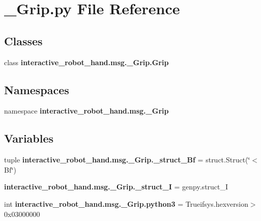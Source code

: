 \section{\-\_\-\-Grip.\-py File Reference}
\label{__Grip_8py}
\subsection*{Classes}
\begin{DoxyCompactItemize}
\item 
class {\bf interactive\-\_\-robot\-\_\-hand.\-msg.\-\_\-\-Grip.\-Grip}
\end{DoxyCompactItemize}
\subsection*{Namespaces}
\begin{DoxyCompactItemize}
\item 
namespace {\bf interactive\-\_\-robot\-\_\-hand.\-msg.\-\_\-\-Grip}
\end{DoxyCompactItemize}
\subsection*{Variables}
\begin{DoxyCompactItemize}
\item 
tuple {\bf interactive\-\_\-robot\-\_\-hand.\-msg.\-\_\-\-Grip.\-\_\-struct\-\_\-\-Bf} = struct.\-Struct(\char`\"{}$<$Bf\char`\"{})
\item 
{\bf interactive\-\_\-robot\-\_\-hand.\-msg.\-\_\-\-Grip.\-\_\-struct\-\_\-\-I} = genpy.\-struct\-\_\-\-I
\item 
int {\bf interactive\-\_\-robot\-\_\-hand.\-msg.\-\_\-\-Grip.\-python3} = Trueifsys.\-hexversion$>$0x03000000
\end{DoxyCompactItemize}
